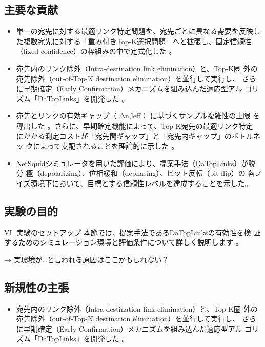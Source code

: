 \documentclass[conference]{IEEEtran}
\begin{document}
\subsection{主要な貢献}
\label{sec:org5cada62}

\begin{itemize}
\item 単一の宛先に対する最適リンク特定問題を、宛先ごとに異なる需要を反映し
た複数宛先に対する「重み付きTop-K選択問題」へと拡張し、固定信頼性
（fixed-confidence）の枠組みの中で定式化した 。

\item 宛先内のリンク除外（Intra-destination link elimination）と、Top-K圏
外の宛先除外（out-of-Top-K destination elimination）を並行して実行し、
さらに早期確定（Early Confirmation）メカニズムを組み込んだ適応型アル
ゴリズム「DaTopLinks」を開発した 。

\item 宛先とリンクの有効ギャップ（ Δn,leff ）に基づくサンプル複雑性の上限
を導出した 。さらに、早期確定機能によって、Top-K宛先の最適リンク特定
にかかる測定コストが「宛先間ギャップ」と「宛先内ギャップ」のボトルネッ
クによって支配されることを理論的に示した 。

\item NetSquidシミュレータを用いた評価により、提案手法（DaTopLinks）が脱分
極（depolarizing）、位相緩和（dephasing）、ビット反転（bit-flip）の
各ノイズ環境下において、目標とする信頼性レベルを達成することを示した。
\end{itemize}



\subsection{実験の目的}
\label{sec:org4632eaf}
VI. 実験のセットアップ 本節では、提案手法であるDaTopLinksの有効性を検
証するためのシミュレーション環境と評価条件について詳しく説明します 。

→ 実環境が\ldots{}と言われる原因はここかもしれない？


\subsection{新規性の主張}
\label{sec:orgc86e64f}
\begin{itemize}
\item 宛先内のリンク除外（Intra-destination link elimination）と、Top-K圏
外の宛先除外（out-of-Top-K destination elimination）を並行して実行し、
さらに早期確定（Early Confirmation）メカニズムを組み込んだ適応型アル
ゴリズム「DaTopLinks」を開発した 。
\end{itemize}
\end{document}

